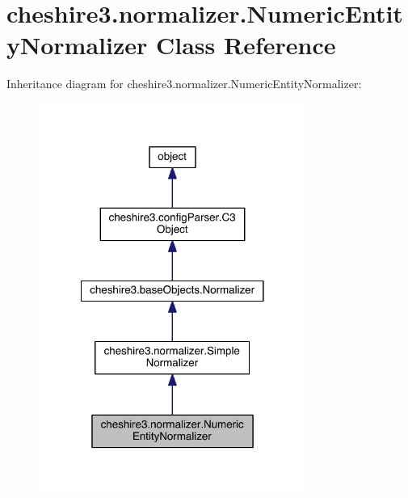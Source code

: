 \hypertarget{classcheshire3_1_1normalizer_1_1_numeric_entity_normalizer}{\section{cheshire3.\-normalizer.\-Numeric\-Entity\-Normalizer Class Reference}
\label{classcheshire3_1_1normalizer_1_1_numeric_entity_normalizer}
}


Inheritance diagram for cheshire3.\-normalizer.\-Numeric\-Entity\-Normalizer\-:
\nopagebreak
\begin{figure}[H]
\begin{center}
\leavevmode
\includegraphics[width=248pt]{classcheshire3_1_1normalizer_1_1_numeric_entity_normalizer__inherit__graph}
\end{center}
\end{figure}


